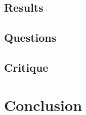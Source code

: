 \documentclass[a4paper]{article} %
\begin{document}
\subsection{Results}






\subsection{Questions}







\subsection{Critique}







\section{Conclusion}











\end{document}
